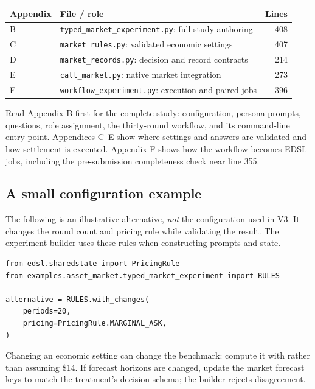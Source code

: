 \documentclass[11pt,letterpaper]{article}
\def\activefile{none}
\begin{document}
\begin{center}\small
\begin{tabularx}{\linewidth}{@{}lXr@{}}\toprule
Appendix & File / role & Lines\\\midrule
B & \texttt{typed\_market\_experiment.py}: full study authoring & 408\\
C & \texttt{market\_rules.py}: validated economic settings & 407\\
D & \texttt{market\_records.py}: decision and record contracts & 214\\
E & \texttt{call\_market.py}: native market integration & 273\\
F & \texttt{workflow\_experiment.py}: execution and paired jobs & 396\\\bottomrule
\end{tabularx}
\end{center}
Read Appendix B first for the complete study: configuration, persona prompts,
questions, role assignment, the thirty-round workflow, and its command-line
entry point. Appendices C--E show where settings and answers are validated
and how settlement is executed. Appendix F shows how the workflow becomes
EDSL jobs, including the pre-submission completeness check near line 355.

\subsection*{A small configuration example}
The following is an illustrative alternative, \emph{not} the configuration used
in V3. It changes the round count and pricing rule while validating the result.
The experiment builder uses these rules when constructing prompts and state.
\def\activefile{none}
\begin{lstlisting}[numbers=none]
from edsl.sharedstate import PricingRule
from examples.asset_market.typed_market_experiment import RULES

alternative = RULES.with_changes(
    periods=20,
    pricing=PricingRule.MARGINAL_ASK,
)
\end{lstlisting}
Changing an economic setting can change the benchmark: compute it with
 rather than assuming \$14.
If forecast horizons are changed, update the market forecast keys to match
the treatment's decision schema; the builder rejects disagreement.






\end{document}
